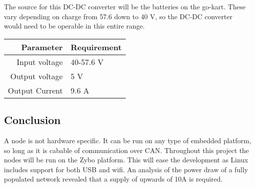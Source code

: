 The source for this DC-DC converter will be the batteries on the go-kart. 
These vary depending on charge from 57.6 down to 40 V, so the DC-DC converter would need to be operable in this entire range.


\begin{table}[H]
	\centering
	\begin{tabular}{r|l}
		Parameter & Requirement  \\
		\hline
		Input voltage & 40-57.6 V\\
		Output voltage & 5 V\\
		Output Current & 9.6 A
	\end{tabular}
\end{table}


\subsection{Conclusion}
A node is not hardware specific.
It can be run on any type of embedded platform, so long as it is cabable of communication over CAN.
Throughout this project the nodes will be run on the Zybo platform.
This will ease the development as Linux includes support for both USB and wifi.
An analysis of the power draw of a fully populated network revealed that a supply of upwards of 10\si{\ampere} is required.